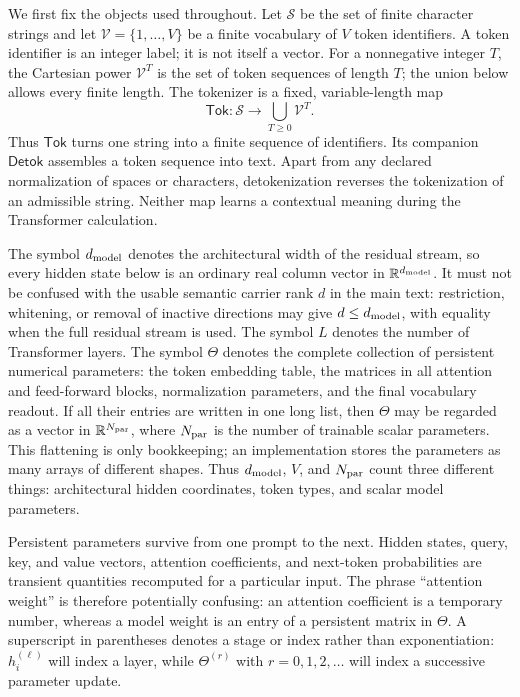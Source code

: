 \documentclass[
  aps,
  reprint,
  superscriptaddress,
  floatfix,
  nofootinbib,
  longbibliography
]{revtex4-2}
\newcommand{\R}{\mathbb{R}}
\begin{document}
We first fix the objects used throughout.  Let $\mathcal S$ be the set of
finite character strings and let $\mathcal V=\{1,\ldots,V\}$ be a finite
vocabulary of $V$ token identifiers.  A token identifier is an integer label;
it is not itself a vector.  For a nonnegative integer $T$, the Cartesian power
$\mathcal V^T$ is the set of token sequences of length $T$; the union below
allows every finite length.  The tokenizer is a fixed, variable-length map
\begin{equation}
\label{eq:app-tokenizer}
\mathsf{Tok}:\mathcal S\longrightarrow
\bigcup_{T\geq0}\mathcal V^T.
\end{equation}
Thus $\mathsf{Tok}$ turns one string into a finite sequence of identifiers.  Its
companion $\mathsf{Detok}$ assembles a token sequence into text.  Apart from any
declared normalization of spaces or characters, detokenization reverses the
tokenization of an admissible string.  Neither map learns a contextual meaning
during the Transformer calculation.

The symbol $d_{\rm model}$ denotes the architectural width of the residual
stream, so every hidden state below is an ordinary real column vector in
$\R^{d_{\rm model}}$.  It must not be confused with the usable semantic carrier
rank $d$ in the main text: restriction, whitening, or removal of inactive
directions may give $d\leq d_{\rm model}$, with equality when the full residual
stream is used.  The symbol $L$ denotes the number of Transformer layers.  The
symbol $\Theta$ denotes the complete
collection of persistent numerical parameters: the token embedding table, the
matrices in all attention and feed-forward blocks, normalization parameters,
and the final vocabulary readout.  If all their entries are written in one long
list, then $\Theta$ may be regarded as a vector in $\R^{N_{\rm par}}$, where
$N_{\rm par}$ is the number of trainable scalar parameters.  This flattening is
only bookkeeping; an implementation stores the parameters as many arrays of
different shapes.  Thus $d_{\rm model}$, $V$, and $N_{\rm par}$ count three
different things: architectural hidden coordinates, token types, and scalar
model parameters.

Persistent parameters survive from one prompt to the next.  Hidden states,
query, key, and value vectors, attention coefficients, and next-token
probabilities are transient quantities recomputed for a particular input.  The
phrase ``attention weight'' is therefore potentially confusing: an attention
coefficient is a temporary number, whereas a model weight is an entry of a
persistent matrix in $\Theta$.  A superscript in parentheses denotes a stage
or index rather than exponentiation: $h_i^{(\ell)}$ will index a layer, while
$\Theta^{(r)}$ with $r=0,1,2,\ldots$ will index a successive parameter update.
\end{document}
